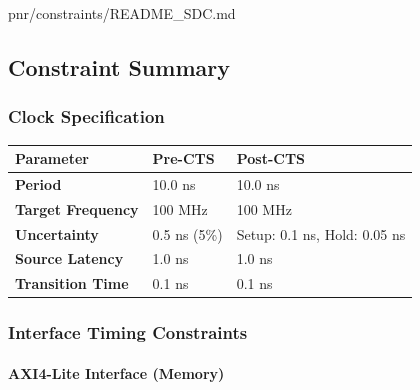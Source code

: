 \begin{relocated}{pnr/constraints/README_SDC.md}
\subsection{Constraint Summary}\label{tm:pd:constraints-readme-sdc:constraint-summary}

\subsubsection{Clock Specification}\label{tm:pd:constraints-readme-sdc:clock-specification}

{
\begin{longtable}[]{@{}lll@{}}
\toprule\noalign{}
Parameter & Pre-CTS & Post-CTS \\
\midrule\noalign{}
\endhead
\bottomrule\noalign{}
\endlastfoot
\textbf{Period} & 10.0 ns & 10.0 ns \\
\textbf{Target Frequency} & 100 MHz & 100 MHz \\
\textbf{Uncertainty} & 0.5 ns (5\%) & Setup: 0.1 ns, Hold: 0.05 ns \\
\textbf{Source Latency} & 1.0 ns & 1.0 ns \\
\textbf{Transition Time} & 0.1 ns & 0.1 ns \\
\end{longtable}
}

\subsubsection{Interface Timing Constraints}\label{tm:pd:constraints-readme-sdc:interface-timing-constraints}

\paragraph{AXI4-Lite Interface (Memory)}\label{tm:pd:constraints-readme-sdc:axi4-lite-interface-memory}


\end{relocated}
